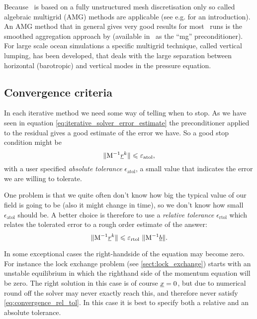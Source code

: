 Because \fluidity\ is based on a fully
unstructured mesh discretisation only so called algebraic multigrid (AMG)
methods are applicable (see e.g. \citet{stueben2001} for an
introduction). An AMG method that in general gives very good
results for most \fluidity\ runs is the smoothed aggregation approach by
\citet{vanek1996} (available in \fluidity\ as the ``mg''
preconditioner). For large scale ocean simulations a specific multigrid
technique, called vertical lumping\citep{kramer2010},
has been developed, that deals with the large separation between
horizontal (barotropic) and vertical modes in the pressure equation.

\subsection{Convergence criteria}
In each iterative method we need some way of telling when to stop.
As we have seen in equation \eqref{eq:iterative_solver_error_estimate}
the preconditioner applied to the residual gives a good estimate of the
error we have. So a good stop condition might be
\begin{equation*}
  \|\mathrm{M}^{-1} \underline{r}^k\| \leqslant \varepsilon_{\text{atol}},
\end{equation*}
with a user specified
\emph{absolute tolerance} $\epsilon_{\text{atol}}$, a small value
that indicates the error we are willing to tolerate.

One problem is that we quite often don't know how big the
typical value of our field is going to be (also it might change in time),
so we don't know how small $\epsilon_{\text{atol}}$ should be.
A better choice is therefore to use a \emph{relative tolerance}
$\epsilon_{\text{rtol}}$
which relates the tolerated error to a rough order estimate of the answer:
\begin{equation}\label{eq:convergence_rel_tol}
  \|\mathrm{M}^{-1} \underline{r}^k\| \leqslant
    \varepsilon_{\text{rtol}}~ \|\mathrm{M}^{-1} \underline{b}\|.
\end{equation}

In some exceptional cases the right-handside of the equation may
become zero. For instance the lock exchange problem
(see \ref{sect:lock_exchange}) starts with an unstable equilibrium in which the righthand
side of the momentum equation will be zero. The right solution in this case
is of course $\underline{x}=0$, but due to numerical round off the solver may
never exactly reach this,
and therefore never satisfy \ref{eq:convergence_rel_tol}. In this case
it is best to specify both a relative and an absolute tolerance.

